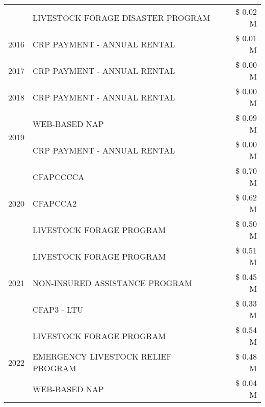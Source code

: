 \begin{tabular}{llr}
 & LIVESTOCK FORAGE DISASTER PROGRAM & \$ 0.02 M \\
\cline{1-3}
2016 & CRP PAYMENT - ANNUAL RENTAL & \$ 0.01 M \\
\cline{1-3}
2017 & CRP PAYMENT - ANNUAL RENTAL & \$ 0.00 M \\
\cline{1-3}
2018 & CRP PAYMENT - ANNUAL RENTAL & \$ 0.00 M \\
\cline{1-3}
\multirow[t]{2}{*}{2019} & WEB-BASED NAP & \$ 0.09 M \\
 & CRP PAYMENT - ANNUAL RENTAL & \$ 0.00 M \\
\cline{1-3}
\multirow[t]{3}{*}{2020} & CFAPCCCCA & \$ 0.70 M \\
 & CFAPCCA2 & \$ 0.62 M \\
 & LIVESTOCK FORAGE PROGRAM & \$ 0.50 M \\
\cline{1-3}
\multirow[t]{3}{*}{2021} & LIVESTOCK FORAGE PROGRAM & \$ 0.51 M \\
 & NON-INSURED ASSISTANCE PROGRAM & \$ 0.45 M \\
 & CFAP3 - LTU & \$ 0.33 M \\
\cline{1-3}
\multirow[t]{3}{*}{2022} & LIVESTOCK FORAGE PROGRAM & \$ 0.54 M \\
 & EMERGENCY LIVESTOCK RELIEF PROGRAM & \$ 0.48 M \\
 & WEB-BASED NAP & \$ 0.04 M \\
\cline{1-3}
\bottomrule
\end{tabular}
